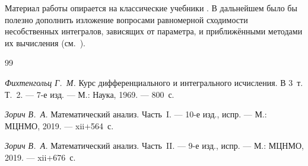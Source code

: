 \documentclass[12pt,a4paper]{article}
\theoremstyle{definition}
\begin{document}
Материал работы опирается на классические учебники \cite{Ficht,Zorich1,Zorich2}. В дальнейшем было бы полезно дополнить изложение вопросами равномерной сходимости несобственных интегралов, зависящих от параметра, и приближёнными методами их вычисления (см.~\cite[гл.~XIII,~\S5]{Ficht}).

\begin{thebibliography}{99}

\emph{Фихтенгольц Г.~М.} Курс дифференциального и интегрального исчисления. В 3~т. Т.~2. — 7-е изд. — М.: Наука, 1969. — 800~с.

\emph{Зорич В.~А.} Математический анализ. Часть~I. — 10-е изд., испр. — М.: МЦНМО, 2019. — xii+564~с.

\emph{Зорич В.~А.} Математический анализ. Часть~II. — 9-е изд., испр. — М.: МЦНМО, 2019. — xii+676~с.

\end{thebibliography}
\end{document}
